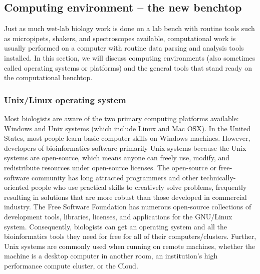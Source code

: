 \documentclass[ChapterTOCs,krantz2]{krantz} %
\begin{document}
\subsection{Computing environment -- the new benchtop}

Just as much wet-lab biology work is done on a lab bench with routine tools
such as micropipets, shakers, and spectroscopes available, computational work
is usually performed on a computer with routine data parsing and analysis tools
installed.  In this section, we will discuss computing environments (also
sometimes called operating systems or platforms) and the general tools that
stand ready on the computational benchtop.  

\subsubsection{Unix/Linux operating system}

Most biologists are aware of the two primary computing platforms available:
Windows and Unix systems (which include Linux and Mac OSX). 
In the United States, most people
learn basic computer skills on Windows machines.  
However, developers of bioinformatics
software primarily Unix systems because the Unix
systems are open-source, which means anyone can freely use, modify, and
redistribute resources under open-source licenses.  The open-source or 
free-software community has long attracted programmers and other 
technically-oriented people who use practical skills  
to creatively solve problems, frequently resulting in solutions that 
are more robust than  
those developed in commercial industry.    
The Free Software Foundation\cite{FSF} has numerous 
open-source collections of development
tools, libraries, licenses, and applications for the GNU/Linux system.
Consequently, biologists can get an operating system and all the bioinformatics
tools they need for free for all of their computers/clusters.  
Further, Unix systems are commonly used when 
running on remote machines, whether the machine is a desktop computer 
in another room, an institution's high performance compute cluster, or 
the Cloud.
\end{document}
